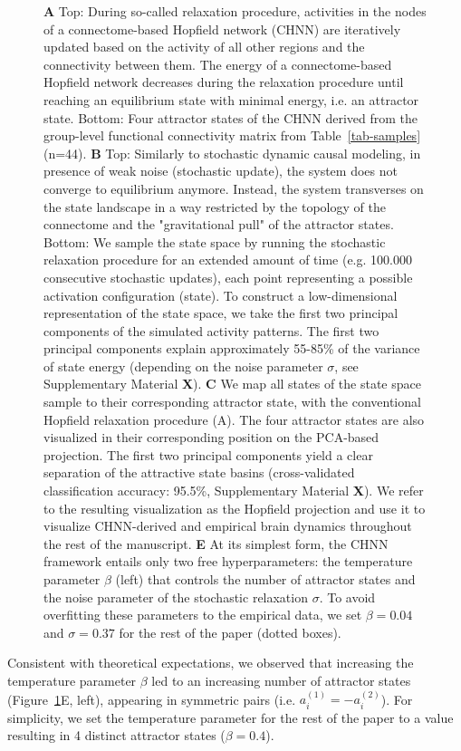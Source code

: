\documentclass{article}
\begin{document}
\begin{figure}[!htbp]
{\textbf{A} Top: During so-called relaxation procedure, activities in the nodes of a connectome-based Hopfield network (CHNN)
are iteratively updated based on the activity of all other regions and the connectivity between them. The energy of a
connectome-based Hopfield network decreases during the relaxation procedure until reaching an equilibrium state with
minimal energy, i.e. an attractor state. Bottom: Four attractor states of the CHNN derived from the
group-level functional connectivity matrix from Table~\ref{tab-samples} (n=44).
\textbf{B} Top: Similarly to stochastic dynamic causal modeling, in presence of weak noise (stochastic update), the system
does not converge to equilibrium anymore. Instead, the system transverses on the state landscape in a way
restricted by the topology of the connectome and the "gravitational pull" of the attractor states. Bottom: We sample
the state space by running the stochastic relaxation procedure for an extended amount of time (e.g. 100.000 consecutive
stochastic updates), each point representing a possible activation configuration (state). To construct a
low-dimensional representation of the state space, we take the first two principal components of the simulated activity
patterns. The first two principal components explain approximately 55-85\% of the variance of state energy (depending
on the noise parameter $\sigma$, see Supplementary Material \textbf{X}).
\textbf{C} We map all states of the state space sample to their corresponding attractor state, with the conventional
Hopfield relaxation procedure (A). The four attractor states are also visualized in their corresponding position on the
PCA-based projection. The first two principal components yield a clear separation of the attractive state basins
(cross-validated classification accuracy: 95.5\%, Supplementary Material \textbf{X}). We refer to the resulting visualization
as the Hopfield projection and use it to visualize CHNN-derived and empirical brain dynamics throughout the rest of
the manuscript.
\textbf{E} At its simplest form, the CHNN framework entails only two free hyperparameters: the temperature parameter
$\beta$ (left) that controls the number of attractor states and the noise parameter of the stochastic relaxation
$\sigma$. To avoid overfitting these parameters to the empirical data, we set $\beta=0.04$ and $\sigma=0.37$ for the
rest of the paper  (dotted boxes).}
\label{attractors}
\end{figure}

Consistent with theoretical expectations, we observed that increasing the temperature parameter $\beta$ led to an
increasing number of attractor states (Figure~\ref{attractors}E, left), appearing in symmetric pairs
(i.e. $a_i^{(1)} = -a_i^{(2)}$). For simplicity, we set the temperature parameter for the rest of the paper to a value
resulting in 4 distinct attractor states ($\beta=0.4$).
\end{document}
